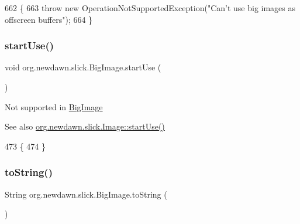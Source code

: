 \begin{DoxyCode}
662                                             \{
663         \textcolor{keywordflow}{throw} \textcolor{keyword}{new} OperationNotSupportedException(\textcolor{stringliteral}{"Can't use big images as offscreen buffers"});
664     \}
\end{DoxyCode}
\mbox{\label{classorg_1_1newdawn_1_1slick_1_1_big_image_ad5fd0ca98577d193516f55bab105a482}} 
\subsubsection{\texorpdfstring{start\+Use()}{startUse()}}
{\footnotesize\ttfamily void org.\+newdawn.\+slick.\+Big\+Image.\+start\+Use (\begin{DoxyParamCaption}{ }\end{DoxyParamCaption})\hspace{0.3cm}{\ttfamily [inline]}}

Not supported in \mbox{\hyperlink{classorg_1_1newdawn_1_1slick_1_1_big_image}{Big\+Image}}

\begin{DoxySeeAlso}{See also}
\mbox{\hyperlink{classorg_1_1newdawn_1_1slick_1_1_image_a6c7c3f31d0a0a4c73026c8dac8dec7d2}{org.\+newdawn.\+slick.\+Image\+::start\+Use()}} 
\end{DoxySeeAlso}

\begin{DoxyCode}
473                            \{
474     \}
\end{DoxyCode}
\mbox{\label{classorg_1_1newdawn_1_1slick_1_1_big_image_a723c94abe07b0e3dbcb94c8d83d59c40}} 
\subsubsection{\texorpdfstring{to\+String()}{toString()}}
{\footnotesize\ttfamily String org.\+newdawn.\+slick.\+Big\+Image.\+to\+String (\begin{DoxyParamCaption}{ }\end{DoxyParamCaption})\hspace{0.3cm}{\ttfamily [inline]}}

